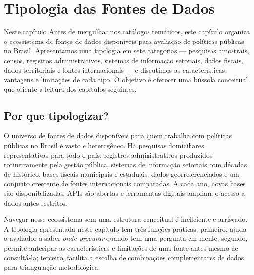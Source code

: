 
\chapter{Tipologia das Fontes de Dados}

\begin{boxdestaque}{Neste capítulo}
Antes de mergulhar nos catálogos temáticos, este capítulo organiza o ecossistema de fontes de dados disponíveis para avaliação de políticas públicas no Brasil. Apresentamos uma tipologia em sete categorias — pesquisas amostrais, censos, registros administrativos, sistemas de informação setoriais, dados fiscais, dados territoriais e fontes internacionais — e discutimos as características, vantagens e limitações de cada tipo. O objetivo é oferecer uma bússola conceitual que oriente a leitura dos capítulos seguintes.
\end{boxdestaque}

\section{Por que tipologizar?}

O universo de fontes de dados disponíveis para quem trabalha com políticas públicas no Brasil é vasto e heterogêneo. Há pesquisas domiciliares representativas para todo o país, registros administrativos produzidos rotineiramente pela gestão pública, sistemas de informação setoriais com décadas de histórico, bases fiscais municipais e estaduais, dados georreferenciados e um conjunto crescente de fontes internacionais comparadas. A cada ano, novas bases são disponibilizadas, APIs são abertas e ferramentas digitais ampliam o acesso a dados antes restritos.

Navegar nesse ecossistema sem uma estrutura conceitual é ineficiente e arriscado. A tipologia apresentada neste capítulo tem três funções práticas: primeiro, ajuda o avaliador a saber \textit{onde procurar} quando tem uma pergunta em mente; segundo, permite antecipar as características e limitações de uma fonte antes mesmo de consultá-la; terceiro, facilita a escolha de combinações complementares de dados para triangulação metodológica.

